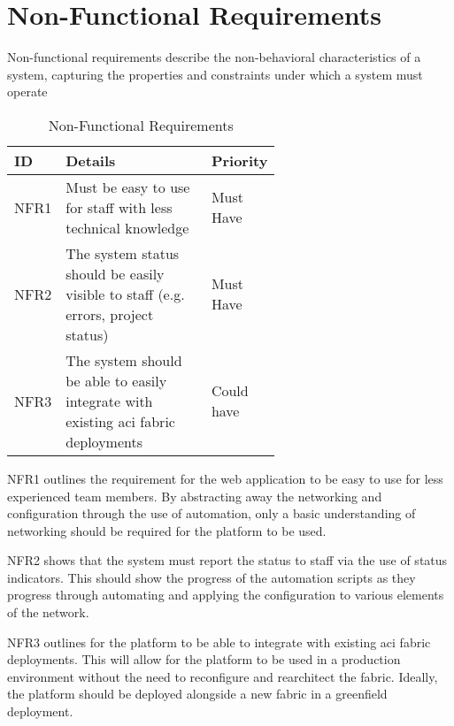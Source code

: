 \section{Non-Functional Requirements}
Non-functional requirements describe the non-behavioral characteristics of a system, capturing the properties and constraints under which a system must operate \citep{12} 
\begin{center}
    \begin{table}[H]
        \begin{tabular}{l p{0.6\linewidth} l}
            \hline
            \textbf{ID}             & \textbf{Details}
                                    & \textbf{Priority}
            \\ \hline
            NFR1                    & Must be easy to use for staff with less technical
            knowledge
                                    & Must Have
            \\ \hline
            NFR2                    & The system status should be easily visible to staff (e.g.
            errors, project status) & Must Have                                                                                       \\ \hline
            NFR3                    & The system should be able to easily integrate with existing \gls{aci} fabric deployments & Could have
        \end{tabular}
        \caption{Non-Functional Requirements}
        \label{requirements:non-functional}
    \end{table}
\end{center}

NFR1 outlines the requirement for the web application to be easy to use for less experienced team members. By abstracting away the networking and configuration through the use of automation, only a basic understanding of networking should be required for the platform to be used.

NFR2 shows that the system must report the status to staff via the use of status indicators. This should show the progress of the automation scripts as they progress through automating and applying the configuration to various elements of the network.

NFR3 outlines for the platform to be able to integrate with existing \gls{aci} fabric deployments. This will allow for the platform to be used in a production environment without the need to reconfigure and rearchitect the fabric. Ideally, the platform should be deployed alongside a new fabric in a greenfield deployment.